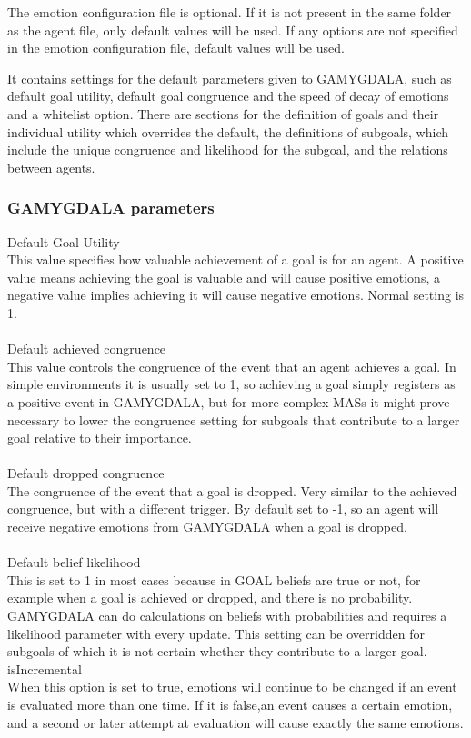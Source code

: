 \documentclass[11pt]{article}
\begin{document}
The emotion configuration file is optional. If it is not present in the same folder as the agent file, only default values will be used. If any options are not specified in the emotion configuration file, default values will be used.

It contains settings for the default parameters given to GAMYGDALA, such as default goal utility, default goal congruence and the speed of decay of emotions and a whitelist option. There are sections for the definition of goals and their individual utility which overrides the default, the definitions of subgoals, which include the unique congruence and likelihood for the subgoal, and the relations between agents.

\subsubsection*{GAMYGDALA parameters}
Default Goal Utility\\
This value specifies how valuable achievement of a goal is for an agent. A positive value means achieving the goal is valuable and will cause positive emotions, a negative value implies achieving it will cause negative emotions. Normal setting is 1.\\
\\
Default achieved congruence\\
This value controls the congruence of the event that an agent achieves a goal. In simple environments it is usually set to 1, so achieving a goal simply registers as a positive event in GAMYGDALA, but for more complex MASs it might prove necessary to lower the congruence setting for subgoals that contribute to a larger goal relative to their importance.\\
\\
Default dropped congruence\\
The congruence of the event that a goal is dropped. Very similar to the achieved congruence, but with a different trigger. By default set to -1, so an agent will receive negative emotions from GAMYGDALA when a goal is dropped.\\
\\
Default belief likelihood\\
This is set to 1 in most cases because in GOAL beliefs are true or not, for example when a goal is achieved or dropped, and there is no probability. GAMYGDALA can do calculations on beliefs with probabilities and requires a likelihood parameter with every update. This setting can be overridden for subgoals of which it is not certain whether they contribute to a larger goal.\\
isIncremental\\
When this option is set to true, emotions will continue to be changed if an event is evaluated more than one time. If it is false,an event causes a certain emotion, and a second or later attempt at evaluation will cause exactly the same emotions.
\\
\end{document}
